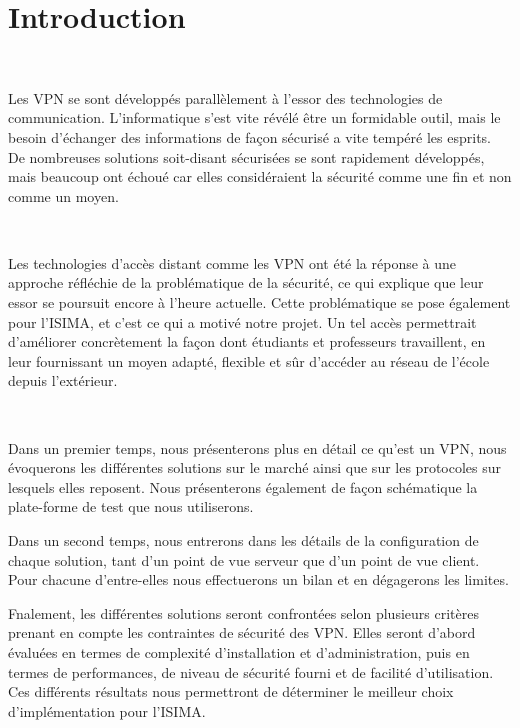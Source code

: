 \section*{Introduction}

~

Les VPN se sont développés parallèlement à l'essor des technologies de communication. L'informatique s'est vite révélé être un formidable outil, mais le besoin d'échanger des informations de façon sécurisé a vite tempéré les esprits. De nombreuses solutions soit-disant sécurisées se sont rapidement développés, mais beaucoup ont échoué car elles considéraient la sécurité comme une fin et non comme un moyen.

~

Les technologies d'accès distant comme les VPN ont été la réponse à une approche réfléchie de la problématique de la sécurité, ce qui explique que leur essor se poursuit encore à l'heure actuelle. Cette problématique se pose également pour l'ISIMA, et c'est ce qui a motivé notre projet. Un tel accès permettrait d'améliorer concrètement la façon dont étudiants et professeurs travaillent, en leur fournissant un moyen adapté, flexible et sûr d'accéder au réseau de l'école depuis l'extérieur.

~

Dans un premier temps, nous présenterons plus en détail ce qu'est un VPN, nous évoquerons les différentes solutions sur le marché ainsi que sur les protocoles sur lesquels elles reposent. Nous présenterons également de façon schématique la plate-forme de test que nous utiliserons.

Dans un second temps, nous entrerons dans les détails de la configuration de chaque solution, tant d'un point de vue serveur que d'un point de vue client. Pour chacune d'entre-elles nous effectuerons un bilan et en dégagerons les limites.

Fnalement, les différentes solutions seront confrontées selon plusieurs critères prenant en compte les contraintes de sécurité des VPN. Elles seront d'abord évaluées en termes de complexité d'installation et d'administration, puis en termes de performances, de niveau de sécurité fourni et de facilité d'utilisation. Ces différents résultats nous permettront de déterminer le meilleur choix d'implémentation pour l'ISIMA.

\pagebreak
